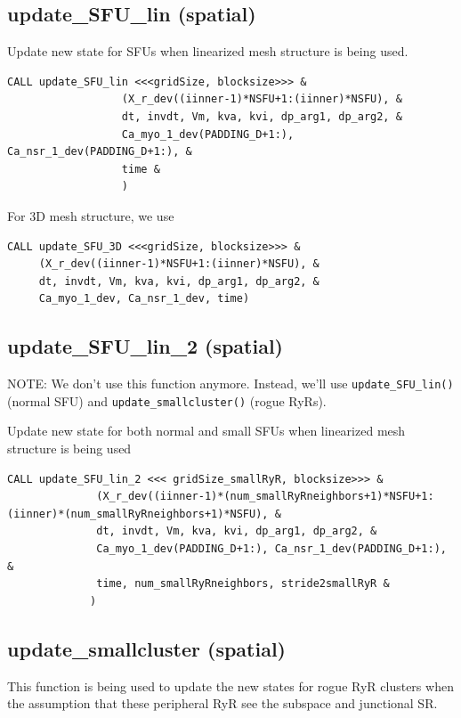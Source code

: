 \subsection{update\_SFU\_lin (spatial)}
\label{sec:update_SFU_lin}


Update new state for SFUs when linearized mesh structure is being used.
\begin{verbatim}
CALL update_SFU_lin <<<gridSize, blocksize>>> &
                  (X_r_dev((iinner-1)*NSFU+1:(iinner)*NSFU), &
                  dt, invdt, Vm, kva, kvi, dp_arg1, dp_arg2, &
                  Ca_myo_1_dev(PADDING_D+1:), Ca_nsr_1_dev(PADDING_D+1:), &
                  time &
                  )
\end{verbatim}

For 3D mesh structure, we use
\begin{verbatim}
CALL update_SFU_3D <<<gridSize, blocksize>>> &
     (X_r_dev((iinner-1)*NSFU+1:(iinner)*NSFU), &
     dt, invdt, Vm, kva, kvi, dp_arg1, dp_arg2, &
     Ca_myo_1_dev, Ca_nsr_1_dev, time)
\end{verbatim}

\subsection{update\_SFU\_lin\_2 (spatial)}
\label{sec:update_SFU_lin_2}

NOTE: We don't use this function anymore. Instead, we'll use
\verb!update_SFU_lin()! (normal SFU) and \verb!update_smallcluster()! (rogue
RyRs).

Update new state for both normal and small SFUs when linearized mesh structure
is being used
\begin{verbatim}
CALL update_SFU_lin_2 <<< gridSize_smallRyR, blocksize>>> &
              (X_r_dev((iinner-1)*(num_smallRyRneighbors+1)*NSFU+1:(iinner)*(num_smallRyRneighbors+1)*NSFU), &
              dt, invdt, Vm, kva, kvi, dp_arg1, dp_arg2, &
              Ca_myo_1_dev(PADDING_D+1:), Ca_nsr_1_dev(PADDING_D+1:), &
              time, num_smallRyRneighbors, stride2smallRyR &
             )
\end{verbatim}

\subsection{update\_smallcluster (spatial)}
\label{sec:update_smallcluster}

This function is being used to update the new states for rogue RyR clusters
when the assumption that these peripheral RyR see the subspace and junctional
SR.

